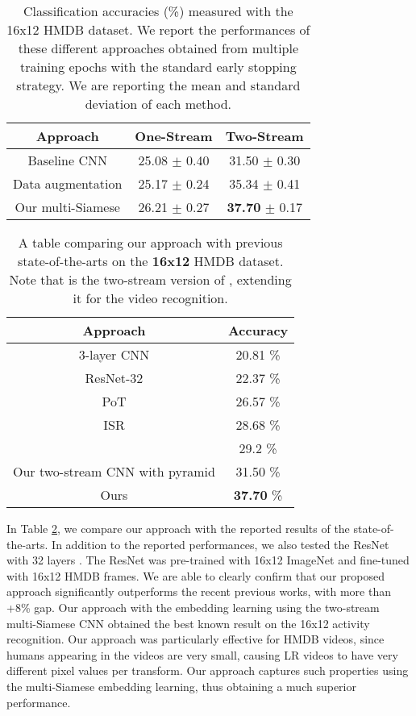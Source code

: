 \documentclass[letterpaper]{article} %
\begin{document}
\begin{table}
	\caption{Classification accuracies (\%) measured with the 16x12 HMDB dataset. We report the performances of these different approaches obtained from multiple training epochs with the standard early stopping strategy. We are reporting the mean and standard deviation of each method.}
	\label{table:hmdb}

	\center
	\setlength\extrarowheight{0.5pt}

		\begin{tabular}{c|c|c}
			\hline 	Approach & One-Stream & Two-Stream \tabularnewline
			\hline 	Baseline CNN & 25.08 $\pm$ 0.40	& 	31.50 $\pm$ 0.30  \tabularnewline
			        Data augmentation & 25.17 $\pm$ 0.24	& 35.34 $\pm$ 0.41  \tabularnewline
			        Our multi-Siamese & 26.21 $\pm$ 0.27	& 	\textbf{37.70} $\pm$ 0.17	  \tabularnewline
			\hline
		\end{tabular}

\end{table}


\begin{table}
	\caption{A table comparing our approach with previous state-of-the-arts on the \textbf{16x12} HMDB dataset. Note that \cite{chen17} is the two-stream version of \cite{lrface16}, extending it for the video recognition.}
	\label{table:hmdb-comp}

	\center
	\setlength\extrarowheight{0.5pt}

		\begin{tabular}{c|c}
			\hline 	Approach & Accuracy \tabularnewline
			\hline 	
			        3-layer CNN \cite{ryoo17privacy} & 20.81 \%	 \tabularnewline
			        ResNet-32 \cite{resnet2016} & 22.37 \%	 \tabularnewline
			        PoT \cite{ryoo15} & 26.57 \% \tabularnewline
			        ISR \cite{ryoo17privacy} & 28.68 \%	 \tabularnewline
			        \cite{chen17} & 29.2 \% \tabularnewline
			\hline
			        Our two-stream CNN with pyramid  & 31.50	\%  \tabularnewline
			        Ours    & \textbf{37.70} \%	  \tabularnewline
			\hline
		\end{tabular}

\end{table}

In Table \ref{table:hmdb-comp}, we compare our approach with the reported results of the state-of-the-arts. In addition to the reported performances, we also tested the ResNet with 32 layers \cite{resnet2016}. The ResNet was pre-trained with 16x12 ImageNet and fine-tuned with 16x12 HMDB frames. We are able to clearly confirm that our proposed approach significantly outperforms the recent previous works, with more than +8\% gap. Our approach with the embedding learning using the two-stream multi-Siamese CNN obtained the best known result on the 16x12 activity recognition. Our approach was particularly effective for HMDB videos, since humans appearing in the videos are very small, causing LR videos to have very different pixel values per transform. Our approach captures such properties using the multi-Siamese embedding learning, thus obtaining a much superior performance.
\end{document}
